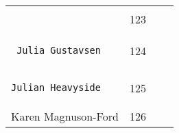 \documentclass[]{article}
\begin{document}
\begin{longtable}[c]{@{}llll@{}}
\begin{minipage}[t]{0.39\columnwidth}
\begin{verbatim}
\end{verbatim}
\end{minipage} & \begin{minipage}[t]{0.10\columnwidth}\raggedright
123
\end{minipage} & \begin{minipage}[t]{0.13\columnwidth}\raggedright
\end{minipage} & \begin{minipage}[t]{0.15\columnwidth}\raggedright
\end{minipage}
\\\noalign{\medskip}
\begin{minipage}[t]{0.39\columnwidth}\raggedright
\begin{verbatim}
 Julia Gustavsen
\end{verbatim}
\end{minipage} & \begin{minipage}[t]{0.10\columnwidth}\raggedright
124
\end{minipage} & \begin{minipage}[t]{0.13\columnwidth}\raggedright
\end{minipage} & \begin{minipage}[t]{0.15\columnwidth}\raggedright
\end{minipage}
\\\noalign{\medskip}
\begin{minipage}[t]{0.39\columnwidth}\raggedright
\begin{verbatim}
Julian Heavyside
\end{verbatim}
\end{minipage} & \begin{minipage}[t]{0.10\columnwidth}\raggedright
125
\end{minipage} & \begin{minipage}[t]{0.13\columnwidth}\raggedright
\end{minipage} & \begin{minipage}[t]{0.15\columnwidth}\raggedright
\end{minipage}
\\\noalign{\medskip}
\begin{minipage}[t]{0.39\columnwidth}\raggedright
Karen Magnuson-Ford
\end{minipage} & \begin{minipage}[t]{0.10\columnwidth}\raggedright
126
\end{minipage} & \begin{minipage}[t]{0.13\columnwidth}\raggedright
\end{minipage} & \begin{minipage}[t]{0.15\columnwidth}\raggedright

\end{minipage}
\end{longtable}
\end{document}
